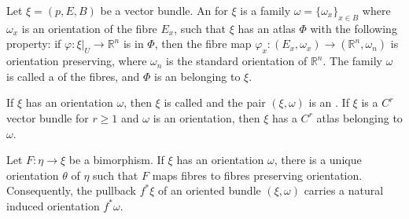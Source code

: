 Let $\xi = (p, E, B)$ be a vector bundle. An  for $\xi$ is a family $\omega = \{\omega_x\}_{x \in B}$ where $\omega_x$ is an orientation of the fibre $E_x$, such that $\xi$ has an atlas $\Phi$ with the following property: if $\varphi: \xi|_U \to \mathbb{R}^n$ is in $\Phi$, then the fibre map $\varphi_x: (E_x, \omega_x) \to (\mathbb{R}^n, \omega_n)$ is orientation preserving, where $\omega_n$ is the standard orientation of $\mathbb{R}^n$. The family $\omega$ is called a  of the fibres, and $\Phi$ is an  belonging to $\xi$.

If $\xi$ has an orientation $\omega$, then $\xi$ is called  and the pair $(\xi, \omega)$ is an . If $\xi$ is a $C^r$ vector bundle for $r \geqslant 1$ and $\omega$ is an orientation, then $\xi$ has a $C^r$ atlas belonging to $\omega$.

Let $F: \eta \to \xi$ be a bimorphism. If $\xi$ has an orientation $\omega$, there is a unique orientation $\theta$ of $\eta$ such that $F$ maps fibres to fibres preserving orientation. Consequently, the pullback $f^*\xi$ of an oriented bundle $(\xi, \omega)$ carries a natural induced orientation $f^*\omega$.
